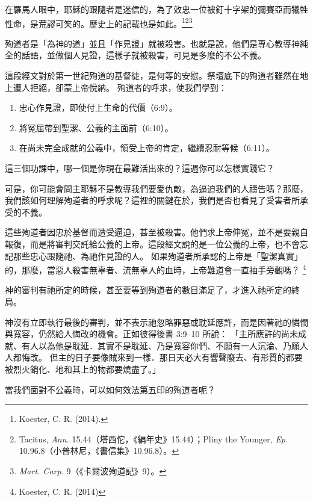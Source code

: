 在羅馬人眼中，耶穌的跟隨者是迷信的，為了效忠一位被釘十字架的彌賽亞而犧牲性命，是荒謬可笑的。歷史上的記載也是如此。\footnote{Koester, C. R. (2014).}\footnote{Tacitus, \textit{Ann.} 15.44（塔西佗，《編年史》15.44）；Pliny the Younger, \textit{Ep.} 10.96.8（小普林尼，《書信集》10.96.8）。}\footnote{\textit{Mart. Carp.} 9（《卡爾波殉道記》9）。}

殉道者是「為神的道」並且「作見證」就被殺害。也就是說，他們是專心教導神純全的話語，並做個人見證，這樣子就被殺害，可見是多麼的不公不義。

這段經文對於第一世紀殉道的基督徒，是何等的安慰。祭壇底下的殉道者雖然在地上遭人拒絕，卻蒙上帝悅納。
殉道者的呼求，使我們學到：

\begin{ReaderQuestion}[殉道者給我們的三個功課]
\begin{enumerate}
\item 忠心作見證，即使付上生命的代價（6:9）。
\item 將冤屈帶到聖潔、公義的主面前（6:10）。
\item 在尚未完全成就的公義中，領受上帝的肯定，繼續忍耐等候（6:11）。
\end{enumerate}

\smallskip
這三個功課中，哪一個是你現在最難活出來的？這週你可以怎樣實踐它？
\end{ReaderQuestion}

可是，你可能會問主耶穌不是教導我們要愛仇敵，為逼迫我們的人禱告嗎？那麼，我們該如何理解殉道者的呼求呢？這裡的關鍵在於，我們是否也看見了受害者所承受的不義。

這些殉道者因忠於基督而遭受逼迫，甚至被殺害。他們求上帝伸冤，並不是要親自報復，而是將審判交託給公義的上帝。這段經文說的是一位公義的上帝，也不會忘記那些忠心跟隨祂、為祂作見證的人。
如果殉道者所承認的上帝是「聖潔真實」的，那麼，當惡人殺害無辜者、流無辜人的血時，上帝難道會一直袖手旁觀嗎？
\footnote{Koester, C. R. (2014)}

神的審判有祂所定的時候，甚至要等到殉道者的數目滿足了，才進入祂所定的終局。

神沒有立即執行最後的審判，並不表示祂忽略罪惡或耽延應許，而是因著祂的憐憫與寬容，仍然給人悔改的機會。正如彼得後書 3:9–10 所說：
「主所應許的尚未成就、有人以為他是耽延．其實不是耽延、乃是寬容你們、不願有一人沉淪、乃願人人都悔改。
但主的日子要像賊來到一樣．那日天必大有響聲廢去、有形質的都要被烈火銷化、地和其上的物都要燒盡了。」

\begin{ReaderQuestion}
當我們面對不公義時，可以如何效法第五印的殉道者呢？
\end{ReaderQuestion}

